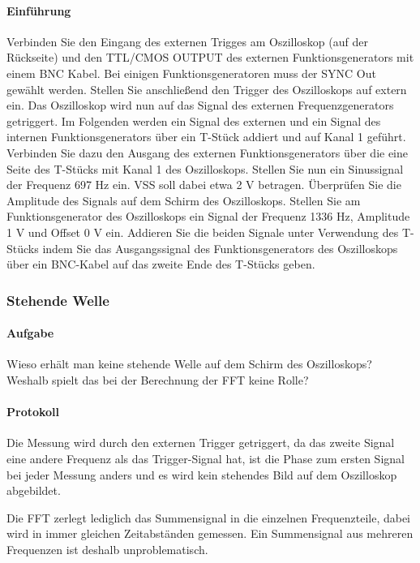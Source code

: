 \documentclass[10pt]{scrreprt}
\begin{document}
        \paragraph{Einführung}
        Verbinden Sie den Eingang des externen Trigges am Oszilloskop (auf der Rückseite) und
        den \glqq{}TTL/CMOS OUTPUT\grqq{} des externen Funktionsgenerators mit einem BNC Kabel.
        Bei einigen Funktionsgeneratoren muss der \glqq{}SYNC Out\grqq{} gewählt werden. Stellen Sie
        anschließend den Trigger des Oszilloskops auf \glqq{}extern\grqq{} ein. Das Oszilloskop wird nun auf
        das Signal des externen Frequenzgenerators getriggert.
        Im Folgenden werden ein Signal des externen und ein Signal des internen Funktionsgenerators
        über ein T-Stück addiert und auf Kanal 1 geführt.
        Verbinden Sie dazu den Ausgang des externen Funktionsgenerators über die eine Seite
        des T-Stücks mit Kanal 1 des Oszilloskops. Stellen Sie nun ein Sinussignal der Frequenz
        697 Hz ein. VSS soll dabei etwa 2 V betragen. Überprüfen Sie die Amplitude des Signals
        auf dem Schirm des Oszilloskops.
        Stellen Sie am Funktionsgenerator des Oszilloskops ein Signal der Frequenz 1336 Hz,
        Amplitude 1 V und Offset 0 V ein. Addieren Sie die beiden Signale unter Verwendung des
        T-Stücks indem Sie das Ausgangssignal des Funktionsgenerators des Oszilloskops über
        ein BNC-Kabel auf das zweite Ende des T-Stücks geben.

        \subsubsection{Stehende Welle}
        \paragraph{Aufgabe}
        Wieso erhält man keine stehende Welle auf dem Schirm des Oszilloskops? Weshalb
        spielt das bei der Berechnung der FFT keine Rolle?
        \paragraph{Protokoll}
        Die Messung wird durch den externen Trigger getriggert, da das zweite Signal
        eine andere Frequenz als das Trigger-Signal hat, ist die Phase zum ersten Signal
        bei jeder Messung anders und es wird kein stehendes Bild auf dem Oszilloskop
        abgebildet.

        Die FFT zerlegt lediglich das Summensignal in die einzelnen Frequenzteile,
        dabei wird in immer gleichen Zeitabständen gemessen. Ein Summensignal aus
        mehreren Frequenzen ist deshalb unproblematisch.
\end{document}
